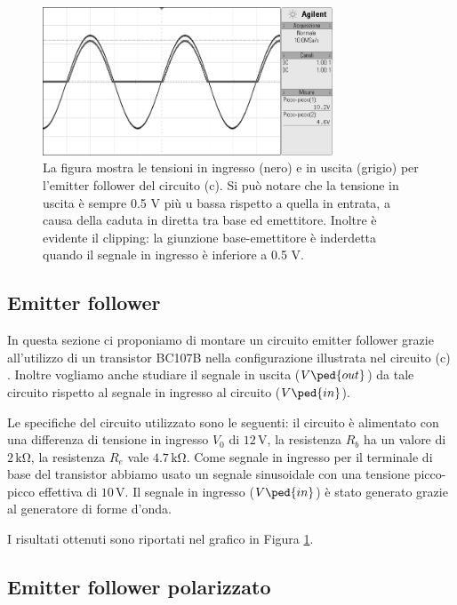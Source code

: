 \begin{figure}
    \includegraphics[width=0.77\textwidth]{emitter.png}
    \caption{La figura mostra le tensioni in ingresso (nero) e in uscita (grigio) per l’emitter follower del circuito (c). Si può notare che la tensione in uscita è sempre
0.5 V più
u bassa rispetto a
quella in entrata, a causa della caduta in diretta tra base ed emettitore. Inoltre è evidente il clipping: la giunzione base-emettitore è inderdetta quando il segnale in ingresso è inferiore a 0.5 V.}
    \label{fig:emitter}
\end{figure}

\subsection*{Emitter follower}

In questa sezione ci proponiamo di montare un circuito emitter follower grazie all'utilizzo di un transistor BC107B nella configurazione illustrata nel circuito (c) . Inoltre vogliamo anche studiare il segnale in uscita ($V\ped{out}$) da tale circuito rispetto al segnale in ingresso al circuito ($V\ped{in}$).

Le specifiche del circuito utilizzato sono le seguenti: il circuito è alimentato con una differenza di tensione in ingresso $V_0$ di $12\,\si{\volt}$, la resistenza $R_b$ ha un valore di $2\,\si{\kilo\ohm}$, la resistenza $R_e$ vale $4.7\,\si{\kilo\ohm}$. Come segnale in ingresso per il terminale di base del transistor abbiamo usato un segnale sinusoidale con una tensione picco-picco effettiva di $10\,\si{\volt}$. Il segnale in ingresso ($V\ped{in}$) è stato generato grazie al generatore di forme d'onda.

I risultati ottenuti sono riportati nel grafico in Figura \ref{fig:emitter}.

\subsection*{Emitter follower polarizzato}

